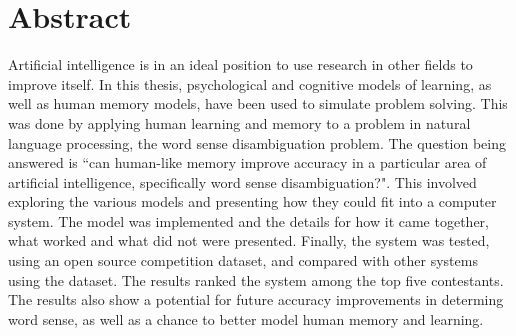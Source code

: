 \doublespacing 
\chapter*{Abstract}

Artificial intelligence is in an ideal position to use research in other fields
to improve itself.  In this thesis, psychological and cognitive
models of learning, as well as human memory models, have been used to simulate problem
solving.  This was done by applying human learning and memory to a problem in
natural language processing, the word sense disambiguation problem. The question being answered is ``can human-like memory improve accuracy in a particular area of artificial intelligence, specifically word sense disambiguation?". This involved exploring the various models and presenting how they could fit into a computer system.  The model was implemented and the details for how it came together, what worked and what did not were presented.  Finally, the system was tested, using an open source competition dataset, and compared with other systems using the dataset.  The results ranked the system among the top five contestants. The results also show a potential for future accuracy improvements in determing word sense, as well as a chance to better model human memory and learning.
